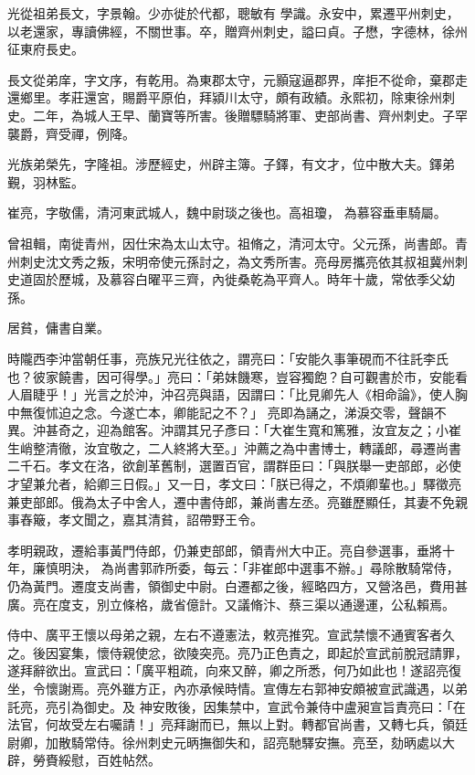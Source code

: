 \begin{pinyinscope}
 光從祖弟長文，字景翰。少亦徙於代都，聰敏有
 學識。永安中，累遷平州刺史，以老還家，專讀佛經，不關世事。卒，贈齊州刺史，謚曰貞。子懋，字德林，徐州征東府長史。



 長文從弟庠，字文序，有乾用。為東郡太守，元顥寇逼郡界，庠拒不從命，棄郡走還鄉里。孝莊還宮，賜爵平原伯，拜潁川太守，頗有政績。永熙初，除東徐州刺史。二年，為城人王早、蘭寶等所害。後贈驃騎將軍、吏部尚書、齊州刺史。子罕襲爵，齊受禪，例降。



 光族弟榮先，字隆祖。涉歷經史，州辟主簿。子鐸，有文才，位中散大夫。鐸弟覲，羽林監。



 崔亮，字敬儒，清河東武城人，魏中尉琰之後也。高祖瓊，
 為慕容垂車騎屬。



 曾祖輯，南徙青州，因仕宋為太山太守。祖脩之，清河太守。父元孫，尚書郎。青州刺史沈文秀之叛，宋明帝使元孫討之，為文秀所害。亮母房攜亮依其叔祖冀州刺史道固於歷城，及慕容白曜平三齊，內徙桑乾為平齊人。時年十歲，常依季父幼孫。



 居貧，傭書自業。



 時隴西李沖當朝任事，亮族兄光往依之，謂亮曰：「安能久事筆硯而不往託李氏也？彼家饒書，因可得學。」亮曰：「弟妹饑寒，豈容獨飽？自可觀書於市，安能看人眉睫乎！」光言之於沖，沖召亮與語，因謂曰：「比見卿先人《相命論》，使人胸中無復怵迫之念。今遂亡本，卿能記之不？」
 亮即為誦之，涕淚交零，聲韻不異。沖甚奇之，迎為館客。沖謂其兄子彥曰：「大崔生寬和篤雅，汝宜友之；小崔生峭整清徹，汝宜敬之，二人終將大至。」沖薦之為中書博士，轉議郎，尋遷尚書二千石。孝文在洛，欲創革舊制，選置百官，謂群臣曰：「與朕舉一吏部郎，必使才望兼允者，給卿三日假。」又一日，孝文曰：「朕已得之，不煩卿輩也。」驛徵亮兼吏部郎。俄為太子中舍人，遷中書侍郎，兼尚書左丞。亮雖歷顯任，其妻不免親事舂簸，孝文聞之，嘉其清貧，詔帶野王令。



 孝明親政，遷給事黃門侍郎，仍兼吏部郎，領青州大中正。亮自參選事，垂將十年，廉慎明決，
 為尚書郭祚所委，每云：「非崔郎中選事不辦。」尋除散騎常侍，仍為黃門。遷度支尚書，領御史中尉。白遷都之後，經略四方，又營洛邑，費用甚廣。亮在度支，別立條格，歲省億計。又議脩汴、蔡三渠以通邊運，公私賴焉。



 侍中、廣平王懷以母弟之親，左右不遵憲法，敕亮推究。宣武禁懷不通賓客者久之。後因宴集，懷侍親使忿，欲陵突亮。亮乃正色責之，即起於宣武前脫冠請罪，遂拜辭欲出。宣武曰：「廣平粗疏，向來又醉，卿之所悉，何乃如此也！遂詔亮復坐，令懷謝焉。亮外雖方正，內亦承候時情。宣傳左右郭神安頗被宣武識遇，以弟託亮，亮引為御史。及
 神安敗後，因集禁中，宣武令兼侍中盧昶宣旨責亮曰：「在法官，何故受左右囑請！」亮拜謝而已，無以上對。轉都官尚書，又轉七兵，領廷尉卿，加散騎常侍。徐州刺史元昞撫御失和，詔亮馳驛安撫。亮至，劾昞處以大辟，勞賚綏慰，百姓帖然。




\end{pinyinscope}
